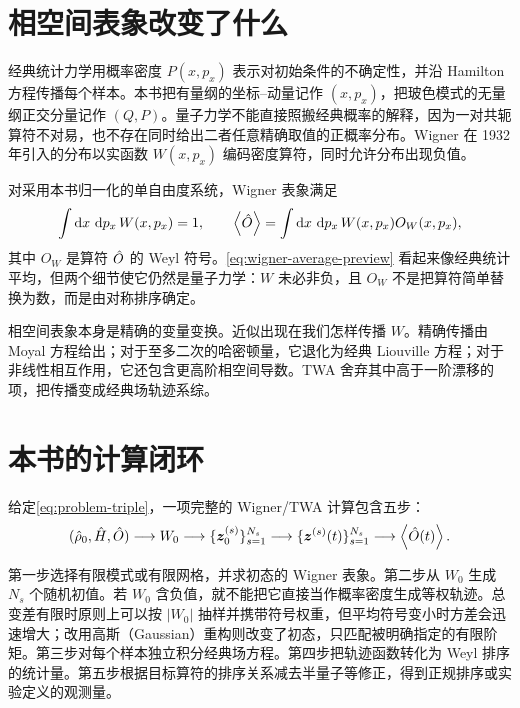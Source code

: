\section{相空间表象改变了什么}

经典统计力学用概率密度 $P(x,p_x)$ 表示对初始条件的不确定性，并沿 Hamilton 方程传播每个样本。本书把有量纲的坐标--动量记作 $(x,p_x)$，把玻色模式的无量纲正交分量记作 $(Q,P)$。量子力学不能直接照搬经典概率的解释，因为一对共轭算符不对易，也不存在同时给出二者任意精确取值的正概率分布。Wigner 在 1932 年引入的分布以实函数 $W(x,p_x)$ 编码密度算符，同时允许分布出现负值\cite{Wigner1932,Hillery1984}。

对采用本书归一化的单自由度系统，Wigner 表象满足
\begin{equation}
  \int\mathop{}\!\mathrm{d} x\,\mathop{}\!\mathrm{d} p_x\,W(x,p_x)=1,
  \qquad
  \left\langle \hat O\right\rangle=\int\mathop{}\!\mathrm{d} x\,\mathop{}\!\mathrm{d} p_x\,W(x,p_x)O_W(x,p_x),
  \label{eq:wigner-average-preview}
\end{equation}
其中 $O_W$ 是算符 $\hat O$ 的 Weyl 符号。\cref{eq:wigner-average-preview} 看起来像经典统计平均，但两个细节使它仍然是量子力学：$W$ 未必非负，且 $O_W$ 不是把算符简单替换为数，而是由对称排序确定。

相空间表象本身是精确的变量变换。近似出现在我们怎样传播 $W$。精确传播由 Moyal 方程给出；对于至多二次的哈密顿量，它退化为经典 Liouville 方程；对于非线性相互作用，它还包含更高阶相空间导数。TWA 舍弃其中高于一阶漂移的项，把传播变成经典场轨迹系综\cite{Moyal1949,Polkovnikov2010}。

\section{本书的计算闭环}

给定\cref{eq:problem-triple}，一项完整的 Wigner/TWA 计算包含五步：
\begin{equation}
  (\hat\rho_0,\hat H,\hat O)
  \longrightarrow W_0
  \longrightarrow \{\bm z^{(s)}_0\}_{s=1}^{N_s}
  \longrightarrow \{\bm z^{(s)}(t)\}_{s=1}^{N_s}
  \longrightarrow \left\langle \hat O(t)\right\rangle.
  \label{eq:book-pipeline}
\end{equation}

第一步选择有限模式或有限网格，并求初态的 Wigner 表象。第二步从 $W_0$ 生成 $N_s$ 个随机初值。若 $W_0$ 含负值，就不能把它直接当作概率密度生成等权轨迹。总变差有限时原则上可以按 $|W_0|$ 抽样并携带符号权重，但平均符号变小时方差会迅速增大；改用高斯（Gaussian）重构则改变了初态，只匹配被明确指定的有限阶矩。第三步对每个样本独立积分经典场方程。第四步把轨迹函数转化为 Weyl 排序的统计量。第五步根据目标算符的排序关系减去半量子等修正，得到正规排序或实验定义的观测量。

